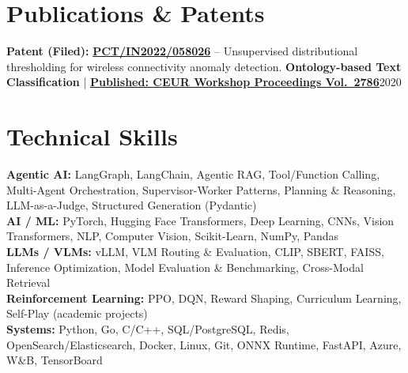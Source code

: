 \documentclass[letterpaper,11pt]{article}
\begin{document}

\resumeItemListEnd
\resumeSubHeadingListEnd

\section{Publications \& Patents}
\resumeSubHeadingListStart
\resumeProjectHeading
{\textbf{Patent (Filed):} \href{https://patents.justia.com/inventor/vedaang-chopra}{\textbf{PCT/IN2022/058026}} -- Unsupervised distributional thresholding for wireless
  connectivity anomaly detection.}{}
\resumeProjectHeading
{\textbf{Ontology-based Text Classification} \;|\; \href{https://ceur-ws.org/Vol-2786/Paper16.pdf}{\textbf{Published: CEUR Workshop Proceedings Vol.\ 2786}}}{2020}
\resumeSubHeadingListEnd

\section{Technical Skills}
\footnotesize
\textbf{Agentic AI:} LangGraph, LangChain, Agentic RAG, Tool/Function Calling, Multi-Agent Orchestration,
  Supervisor-Worker Patterns, Planning \& Reasoning, LLM-as-a-Judge, Structured Generation (Pydantic) \\[1pt]
\textbf{AI / ML:} PyTorch, Hugging Face Transformers, Deep Learning, CNNs, Vision Transformers, NLP,
  Computer Vision, Scikit-Learn, NumPy, Pandas \\[1pt]
\textbf{LLMs / VLMs:} vLLM, VLM Routing \& Evaluation, CLIP, SBERT, FAISS, Inference Optimization,
  Model Evaluation \& Benchmarking, Cross-Modal Retrieval \\[1pt]
\textbf{Reinforcement Learning:} PPO, DQN, Reward Shaping, Curriculum Learning, Self-Play (academic projects) \\[1pt]
\textbf{Systems:} Python, Go, C/C++, SQL/PostgreSQL, Redis, OpenSearch/Elasticsearch, Docker, Linux, Git,
  ONNX Runtime, FastAPI, Azure, W\&B, TensorBoard
\end{document}
